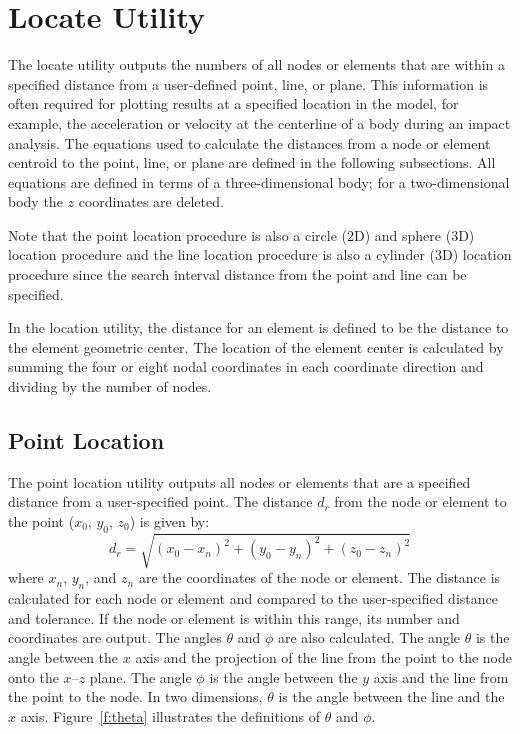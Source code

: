 \section{Locate Utility}\label{sec:locate}

The locate utility outputs the numbers of all nodes or elements that are
within a specified distance from a user-defined point, line, or plane.
This information is often required for plotting results at a specified
location in the model, for example, the acceleration or velocity at the
centerline of a body during an impact analysis.  The equations used to
calculate the distances from a node or element centroid to the point,
line, or plane are defined in the following subsections.  All equations
are defined in terms of a three-dimensional body; for a two-dimensional
body the $z$ coordinates are deleted.

Note that the point location procedure is also a circle (2D) and sphere
(3D) location procedure and the line location procedure is also a
cylinder (3D) location procedure since the search interval distance from
the point and line can be specified.

In the location utility, the distance for an element is defined to be
the distance to the element geometric center. The location of the
element center is calculated by summing the four or eight nodal
coordinates in each coordinate direction and dividing by the number of
nodes.

\subsection{Point Location}\label{sec:plocate}
The point location utility outputs all nodes or elements that are a
specified distance from a user-specified point.  The distance $d_r$ from
the node or element to the point ($x_0$, $y_0$, $z_0$) is given by:
\begin{equation}
d_r = \sqrt{ (x_0-x_n)^2 + (y_0-y_n)^2 + (z_0-z_n)^2}
\end{equation}
where $x_n$, $y_n$, and $z_n$ are the coordinates of the node or
element.  The distance is calculated for each node or element and
compared to the user-specified distance and tolerance.  If the node or
element is within this range, its number and coordinates are output. The
angles $\theta$ and $\phi$ are also calculated.  The angle $\theta$ is
the angle between the $x$ axis and the projection of the line from the
point to the node onto the $x$--$z$ plane.  The angle $\phi$ is the
angle between the $y$ axis and the line from the point to the node.  In
two dimensions, $\theta$ is the angle between the line and the $x$ axis.
Figure~\ref{f:theta} illustrates the definitions of $\theta$ and $\phi$.

